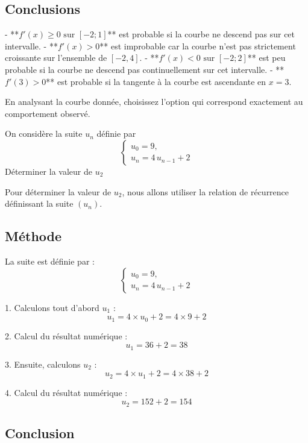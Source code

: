 \documentclass[answers]{exam}
\begin{document}
\begin{questions}
\begin{solution}
\subsection*{Conclusions}

- **$f'(x) \ge 0 \text{ sur } [-2;1]$** est probable si la courbe ne descend pas sur cet intervalle.
- **$f'(x) > 0$** est improbable car la courbe n'est pas strictement croissante sur l'ensemble de $[-2, 4]$.
- **$f'(x) < 0 \text{ sur } [-2;2]$** est peu probable si la courbe ne descend pas continuellement sur cet intervalle.
- **$f'(3) > 0$** est probable si la tangente à la courbe est ascendante en $x=3$.

En analysant la courbe donnée, choisissez l'option qui correspond exactement au comportement observé.
\end{solution}

\question[1] On considère la suite $u_n$ définie par
  \[
    \begin{cases}
      u_0 = 9, \\[4pt]
      u_n = 4\,u_{n-1} + 2 
    \end{cases}
  \]
  Déterminer la valeur de $u_2$



\begin{solution}
Pour déterminer la valeur de $u_2$, nous allons utiliser la relation de récurrence définissant la suite $(u_n)$.

\subsection*{Méthode}

La suite est définie par :
\[
\begin{cases}
u_0 = 9, \\
u_n = 4\,u_{n-1} + 2
\end{cases}
\]

1. Calculons tout d'abord $u_1$ :
   \[
   u_1 = 4 \times u_0 + 2 = 4 \times 9 + 2
   \]

2. Calcul du résultat numérique :
   \[
   u_1 = 36 + 2 = 38
   \]

3. Ensuite, calculons $u_2$ :
   \[
   u_2 = 4 \times u_1 + 2 = 4 \times 38 + 2
   \]

4. Calcul du résultat numérique :
   \[
   u_2 = 152 + 2 = 154
   \]

\subsection*{Conclusion}


\end{solution}
\end{questions}
\end{document}
